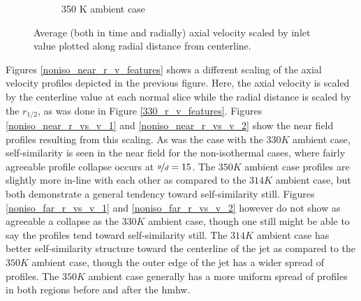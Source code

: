 \begin{figure}[H]
\begin{center}
\begin{subfigure}{0.45\textwidth}
	\caption{350 K ambient case} \label{noniso_v_vin_r_d_2}
\end{subfigure}
\caption{Average (both in time and radially) axial velocity scaled by inlet value plotted along radial distance from centerline.}
\label{noniso_v_vin_r_d_features}
\end{center}
\end{figure}
Figures \ref{noniso_near_r_v_features} shows a different scaling of the axial velocity profiles depicted in the previous figure. Here, the axial velocity is scaled by the centerline value at each normal slice while the radial distance is scaled by the $r_{1/2}$, as was done in Figure \ref{330_r_v_features}. Figures \ref{noniso_near_r_vs_v_1} and \ref{noniso_near_r_vs_v_2} show the near field profiles resulting from this scaling. As was the case with the $330 K $ ambient case, self-similarity is seen in the near field for the non-isothermal cases, where fairly agreeable profile collapse occurs at $\nicefrac{y}{d} = 15$. The $350 K$ ambient case profiles are slightly more in-line with each other as compared to the $314 K$ ambient case, but both demonstrate a general tendency toward self-similarity still. Figures \ref{noniso_far_r_vs_v_1} and \ref{noniso_far_r_vs_v_2} however do not show as agreeable a collapse as the $330 K$ ambient case, though one still might be able to say the profiles tend toward self-similarity still. The $314 K$ ambient case has better self-similarity structure toward the centerline of the jet as compared to the $350 K$ ambient case, though the outer edge of the jet has a wider spread of profiles. The $350 K$ ambient case generally has a more uniform spread of profiles in both regions before and after the \gls{hmhw}. 
